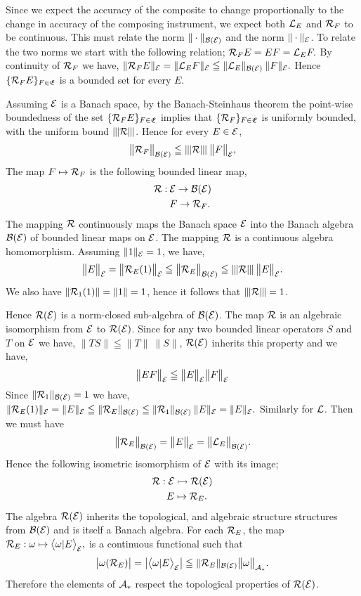 \documentclass[11pt]{article}
\begin{document}
Since we expect the accuracy of the composite to change proportionally to the change in accuracy of the composing instrument, we expect both $\mathcal{L}_E$ and $\mathcal{R}_F$ to be continuous. This must relate the norm $\|\cdot\|_{\mathcal{B}(\mathcal{E})}$ and the norm $\|\cdot\|_{\mathcal{E}}$. To relate the two norms we start with the following relation; $\mathcal{R}_FE=EF=\mathcal{L}_E F.$ By continuity of $\mathcal{R}_F$ we have, $\| \mathcal{R}_F E\|_{\mathcal{E}} =\| \mathcal{L}_E F\|_{\mathcal{E}}\leqq \| \mathcal{L}_E \|_{\mathcal{B}(\mathcal{E})}\:\| F\|_{\mathcal{E}}.$ Hence $\{\mathcal{R}_F E\}_{F\in \mathfrak{E}}$ is a bounded set for every $E$. 

Assuming $\mathcal{E}$ is a Banach space, by the Banach-Steinhaus theorem the point-wise boundedness of the set $\{\mathcal{R}_F E\}_{F\in \mathfrak{E}}$ implies that $\{\mathcal{R}_F\}_{F\in {\mathfrak{E}}}$ is uniformly bounded, with the uniform bound ${\left\vert\kern-0.125ex\left\vert\kern-0.125ex\left\vert \mathcal{R} \right\vert\kern-0.125ex\right\vert\kern-0.125ex\right\vert}$. Hence for every $E\in \mathcal{E}$,
$$\big\|\mathcal{R}_F\big\|_{\mathcal{B}(\mathcal{E})} \leqq {\left\vert\kern-0.125ex\left\vert\kern-0.125ex\left\vert \mathcal{R}\right\vert\kern-0.125ex\right\vert\kern-0.125ex\right\vert} \:\big\|F\big\|_{\mathcal{E}},$$
The map $F\mapsto \mathcal{R}_F$ is the following bounded linear map,
\begin{align*}
	\mathcal{R}:\:&\mathcal{E}\to \mathcal{B}(\mathcal{E})\\
	&F\to \mathcal{R}_F.
\end{align*}
The mapping $\mathcal{R}$ continuously maps the Banach space ${\mathcal{E}}$ into the Banach algebra $\mathcal{B}({\mathcal{E}})$ of bounded linear maps on $\mathcal{E}$. The mapping $\mathcal{R}$ is a continuous algebra homomorphism. Assuming $\|1\|_{\mathcal{E}}=1$, we have,
$$\big\|E\big\|_{\mathcal{E}}=\big\|\mathcal{R}_E(1)\big\|_{\mathcal{E}} \leqq \big\|\mathcal{R}_E\big\|_{\mathcal{B}(\mathcal{E})}\leqq {\left\vert\kern-0.125ex\left\vert\kern-0.125ex\left\vert \mathcal{R}\right\vert\kern-0.125ex\right\vert\kern-0.125ex\right\vert} \:\big\|E\big\|_{\mathcal{E}}.$$
We also have $\|\mathcal{R}_1 (1)\|=\|1\|=1$, hence it follows that ${\left\vert\kern-0.125ex\left\vert\kern-0.125ex\left\vert \mathcal{R} \right\vert\kern-0.125ex\right\vert\kern-0.125ex\right\vert} =1$.

Hence $\mathcal{R}(\mathcal{E})$ is a norm-closed sub-algebra of $\mathcal{B}({\mathcal{E}})$. The map $\mathcal{R}$ is an algebraic isomorphism from ${\mathcal{E}}$ to $\mathcal{R}({\mathcal{E}})$. Since for any two bounded linear operators $S$ and $T$ on ${\mathcal{E}}$ we have, $\|TS\| \leqq \|T\|\:\|S\|$, $\mathcal{R}({\mathcal{E}})$ inherits this property and we have,
$$\big\|EF\big\|_{\mathcal{E}}\leqq \big\|E\big\|_{\mathcal{E}}\big\|F\big\|_{\mathcal{E}}$$
Since $\|\mathcal{R}_1\|_{\mathcal{B}(\mathcal{E})}=1$ we have, $\|\mathcal{R}_E(1)\|_{\mathcal{E}} =\|E\|_{\mathcal{E}} \leqq \|\mathcal{R}_E\|_{\mathcal{B}(\mathcal{E})} \leqq \|\mathcal{R}_1\|_{\mathcal{B}(\mathcal{E})}\:\|E\|_{\mathcal{E}}=\|E\|_{\mathcal{E}}.$ Similarly for $\mathcal{L}$.  Then we must have
$$\big\|\mathcal{R}_E\big\|_{\mathcal{B}(\mathcal{E})}=\big\|E\big\|_{\mathcal{E}}=\big\|\mathcal{L}_E\big\|_{\mathcal{B}(\mathcal{E})}.$$
Hence the following isometric isomorphism of $\mathcal{E}$ with its image;
\begin{align*}
	\mathcal{R}:\mathcal{E}&\rightarrowtail \mathcal{R}(\mathcal{E})\\
E&\mapsto \mathcal{R}_E.
\end{align*}
The algebra $\mathcal{R}({\mathcal{E}})$ inherits the topological, and algebraic structure structures from $\mathcal{B}(\mathcal{E})$ and is itself a Banach algebra. For each $\mathcal{R}_E$, the map $\mathcal{R}_E:\omega\mapsto \big\langle \omega|E\big\rangle_{\mathcal{E}},$ is a continuous functional such that
$$\big|\omega(\mathcal{R}_E)\big|=\big|\big\langle \omega|E\big\rangle_{\mathcal{E}}\big|\leqq \|\mathcal{R}_E\|_{\mathcal{B}(\mathcal{E})}\big\|\omega\big\|_{\mathcal{A}_*}.$$
Therefore the elements of $\mathcal{A}_* $ respect the topological properties of $\mathcal{R}(\mathcal{E})$.
\end{document}
